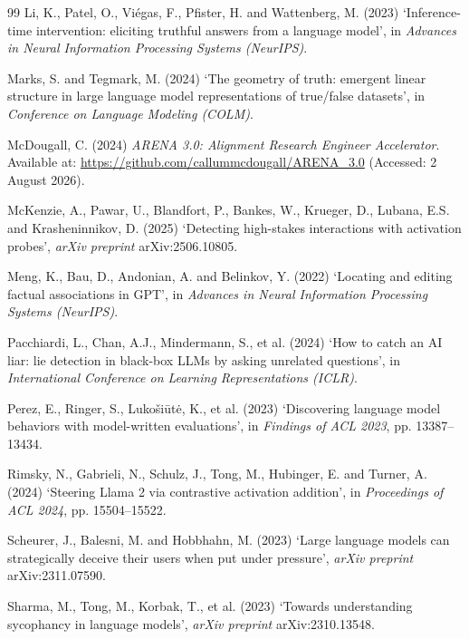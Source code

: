 \documentclass[conference]{IEEEtran}
\begin{document}
\begin{thebibliography}{99}
Li, K., Patel, O., Vi\'egas, F., Pfister, H. and Wattenberg, M. (2023)
`Inference-time intervention: eliciting truthful answers from a language model',
in \textit{Advances in Neural Information Processing Systems (NeurIPS)}.

Marks, S. and Tegmark, M. (2024) `The geometry of truth: emergent linear
structure in large language model representations of true/false datasets', in
\textit{Conference on Language Modeling (COLM)}.

McDougall, C. (2024) \textit{ARENA 3.0: Alignment Research Engineer
Accelerator}. Available at: \url{https://github.com/callummcdougall/ARENA_3.0}
(Accessed: 2 August 2026).

McKenzie, A., Pawar, U., Blandfort, P., Bankes, W., Krueger, D., Lubana, E.S.
and Krasheninnikov, D. (2025) `Detecting high-stakes interactions with
activation probes', \textit{arXiv preprint} arXiv:2506.10805.

Meng, K., Bau, D., Andonian, A. and Belinkov, Y. (2022) `Locating and editing
factual associations in GPT', in \textit{Advances in Neural Information
Processing Systems (NeurIPS)}.

Pacchiardi, L., Chan, A.J., Mindermann, S., et al. (2024) `How to catch an AI
liar: lie detection in black-box LLMs by asking unrelated questions', in
\textit{International Conference on Learning Representations (ICLR)}.

Perez, E., Ringer, S., Luko\v{s}i\=ut\.e, K., et al. (2023) `Discovering language
model behaviors with model-written evaluations', in \textit{Findings of ACL
2023}, pp. 13387--13434.

Rimsky, N., Gabrieli, N., Schulz, J., Tong, M., Hubinger, E. and Turner, A.
(2024) `Steering Llama 2 via contrastive activation addition', in
\textit{Proceedings of ACL 2024}, pp. 15504--15522.

Scheurer, J., Balesni, M. and Hobbhahn, M. (2023) `Large language models can
strategically deceive their users when put under pressure',
\textit{arXiv preprint} arXiv:2311.07590.

Sharma, M., Tong, M., Korbak, T., et al. (2023) `Towards understanding sycophancy
in language models', \textit{arXiv preprint} arXiv:2310.13548.


\end{thebibliography}
\end{document}
